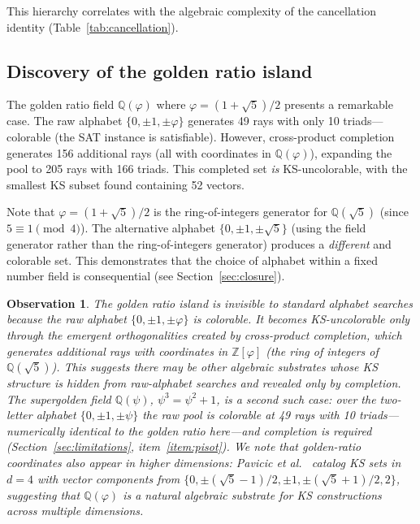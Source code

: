 \documentclass[12pt,a4paper]{article}
\newtheorem{observation}[theorem]{Observation}
\newcommand{\Z}{\mathbb{Z}}
\newcommand{\Q}{\mathbb{Q}}
\begin{document}
This hierarchy correlates with the algebraic complexity of the cancellation identity (Table~\ref{tab:cancellation}).

\subsection{Discovery of the golden ratio island}\label{sec:golden}

The golden ratio field $\Q(\varphi)$ where $\varphi = (1 + \sqrt{5})/2$ presents a remarkable case. The raw alphabet $\{0, \pm 1, \pm\varphi\}$ generates 49 rays with only 10 triads---colorable (the SAT instance is satisfiable). However, cross-product completion generates 156 additional rays (all with coordinates in $\Q(\varphi)$), expanding the pool to 205 rays with 166 triads. This completed set \emph{is} KS-uncolorable, with the smallest KS subset found containing 52 vectors.

Note that $\varphi = (1+\sqrt{5})/2$ is the ring-of-integers generator for $\Q(\sqrt{5})$ (since $5 \equiv 1 \pmod{4}$). The alternative alphabet $\{0, \pm 1, \pm\sqrt{5}\}$ (using the field generator rather than the ring-of-integers generator) produces a \emph{different} and colorable set. This demonstrates that the choice of alphabet within a fixed number field is consequential (see Section~\ref{sec:closure}).

\begin{observation}\label{obs:golden}
The golden ratio island is invisible to standard alphabet searches because the raw alphabet $\{0, \pm 1, \pm\varphi\}$ is colorable. It becomes KS-uncolorable only through the emergent orthogonalities created by cross-product completion, which generates additional rays with coordinates in $\Z[\varphi]$ (the ring of integers of $\Q(\sqrt{5})$). This suggests there may be other algebraic substrates whose KS structure is hidden from raw-alphabet searches and revealed only by completion.  The supergolden field $\Q(\psi)$, $\psi^3 = \psi^2 + 1$, is a second such case: over the two-letter alphabet $\{0, \pm 1, \pm\psi\}$ the raw pool is colorable at 49 rays with 10 triads---numerically identical to the golden ratio here---and completion is required (Section~\ref{sec:limitations}, item~\ref{item:pisot}).  We note that golden-ratio coordinates also appear in higher dimensions: Pavicic et al.~\cite{Pavicic2004} catalog KS sets in $d = 4$ with vector components from $\{0, \pm(\sqrt{5}-1)/2, \pm 1, \pm(\sqrt{5}+1)/2, 2\}$, suggesting that $\Q(\varphi)$ is a natural algebraic substrate for KS constructions across multiple dimensions.
\end{observation}
\end{document}
